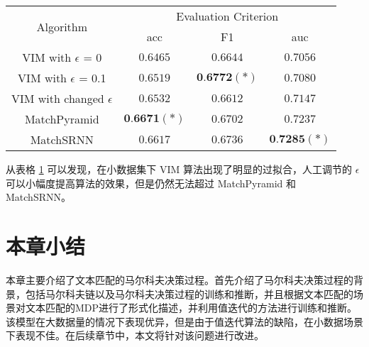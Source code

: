 \begin{table}[H]
    \label{tab:MDP_small_test}
    \centering
    \footnotesize%
    \setlength{\tabcolsep}{4pt}%
    \renewcommand{\arraystretch}{1.2}%
    \begin{tabular}{cccc}
        \hline
        \multirow{2}{*}{Algorithm} &
        \multicolumn{3}{c}{\multirow{1}{*}{Evaluation Criterion}} \\
        \cline{2-4} & acc & F1 & auc \\
        \hline
        VIM with $\epsilon$ = 0 & $0.6465$ & $0.6644$ & $0.7056$ \\
        VIM with $\epsilon$ = 0.1 & $0.6519$ & $\textbf{0.6772}(*)$ & $0.7080$ \\
        VIM with changed $\epsilon$ & $0.6532$ & $0.6612$ & $0.7147$ \\
        \hline
        MatchPyramid & $\textbf{0.6671}(*)$ & $0.6702$ & $0.7237$ \\
        \hline
        MatchSRNN & $0.6617$ & $0.6736$ & $\textbf{0.7285}(*)$\\
        \hline
    \end{tabular}
\end{table}

从表格 \ref{tab:MDP_small_test} 可以发现，在小数据集下 VIM 算法出现了明显的过拟合，人工调节的 $\epsilon$ 可以小幅度提高算法的效果，但是仍然无法超过 MatchPyramid 和 MatchSRNN。

\section{本章小结}
本章主要介绍了文本匹配的马尔科夫决策过程。首先介绍了马尔科夫决策过程的背景，包括马尔科夫链以及马尔科夫决策过程的训练和推断，并且根据文本匹配的场景对文本匹配的MDP进行了形式化描述，并利用值迭代的方法进行训练和推断。该模型在大数据量的情况下表现优异，但是由于值迭代算法的缺陷，在小数据场景下表现不佳。在后续章节中，本文将针对该问题进行改进。
